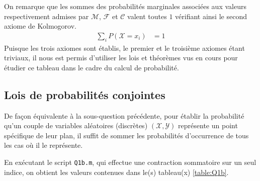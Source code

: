 \documentclass[a4paper, 12pt]{article}
\newcommand{\X}{\mathcal{X}}
\newcommand{\Y}{\mathcal{Y}}
\newcommand{\M}{\mathcal{M}}
\newcommand{\F}{\mathcal{F}}
\newcommand{\C}{\mathcal{C}}
\begin{document}
On remarque que les sommes des probabilités marginales associées aux valeurs respectivement admises par $\M$, $\F$ et $\C$ valent toutes $1$ vérifiant ainsi le second axiome de Kolmogorov.
\begin{align}
	\sum_{i} P(\X = x_i) & = 1
\end{align}
Puisque les trois axiomes sont établis, le premier et le troisième axiomes étant triviaux, il nous est permis d'utiliser les lois et théorèmes vus en cours pour étudier ce tableau dans le cadre du calcul de probabilité.
\subsection{Lois de probabilités conjointes}
De façon équivalente à la sous-question précédente, pour établir la probabilité qu'un couple de variables aléatoires (discrètes) $(\X,\Y)$ représente un point spécifique de leur plan, il suffit de sommer les probabilités d'occurrence de tous les cas où il le représente. \par
En exécutant le script \texttt{Q1b.m}, qui effectue une contraction sommatoire sur un seul indice, on obtient les valeurs contenues dans le(s) tableau(x) \ref{table:Q1b}.
\end{document}
